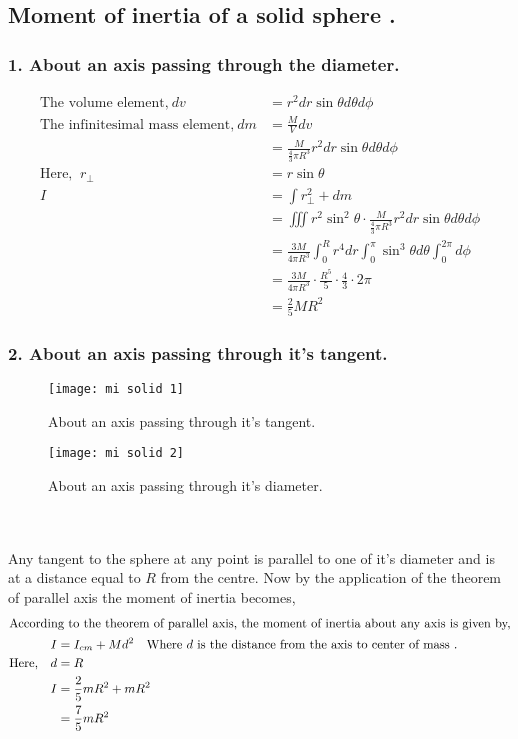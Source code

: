 \subsection{Moment of inertia of a solid sphere .}
\subsubsection{1. About an axis passing through the diameter.}
\begin{align*}
\text{The volume element,}\ dv&= r^{2}dr \sin \theta  d\theta d\phi \\\text{The infinitesimal mass element,} \ dm &=\frac{M}{V} dv\\
&=\frac{M}{\frac{4}{3} \pi R^{3}} r^{2}dr \sin \theta  d\theta d\phi\\
\text{Here, }\ r_{\perp}&=r\sin\theta\\
I&=\int r_{\perp}^{2}+d m\\&=\iiint r^{2} \sin ^{2} \theta \cdot \frac{M}{\frac{4}{3} \pi R^{3}} r^{2} d r \sin \theta d \theta d \phi\\&=\frac{3 M}{4 \pi R^{3}} \int_{0}^{R} r^{4} d r \int_{0}^{\pi} \sin ^{3} \theta d \theta \int_{0}^{2 \pi} d \phi\\
&=\frac{3 M}{4 \pi R^{3}} \cdot \frac{R^{5}}{5} \cdot \frac{4}{3} \cdot 2 \pi\\&=\frac{2}{5} M R^{2}
\end{align*}
\subsubsection{2. About an axis passing through it's tangent.}
\begin{minipage}{0.45\textwidth}
\begin{figure}[H]
	\centering
	\texttt{[image: mi solid 1]}
	\caption{About an axis passing through it's tangent.}
	\label{About an axis passing through it's tangent.}
\end{figure}
\end{minipage}\hfill
\begin{minipage}{0.45\textwidth}
	\begin{figure}[H]
		\centering
		\texttt{[image: mi solid 2]}
		\caption{About an axis passing through it's diameter.}
		\label{About an axis passing through it's diameter.}
	\end{figure}
\end{minipage}\\\\
Any tangent to the sphere at any point is parallel to one of it's diameter and is at  a distance equal to $R$ from the centre.  Now by the application of the theorem of parallel axis  the moment of inertia becomes,
\begin{align*}
\intertext{According to the theorem of parallel axis, the moment of inertia about any axis is given by,}
I&= I_{cm}+M d^{2}\quad  \text{Where $d$ is the distance from the axis to center of mass .}\\
\text{Here,}\quad d&=R\\
I&=\frac{2}{5} m R^{2}+m R^{2}\\&=\frac{7}{5} m R^{2} 
\end{align*}
